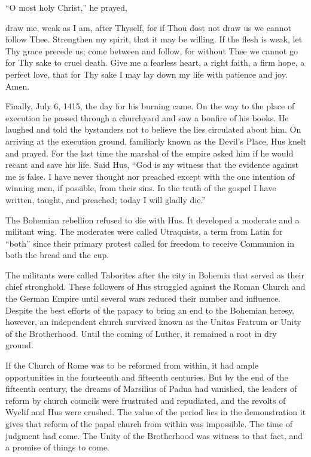 “O most holy Christ,” he prayed,

\begin{blockquote}
draw me, weak as I am, after Thyself, for if Thou dost not draw us we cannot follow Thee. Strengthen
my spirit, that it may be willing. If the flesh is weak, let Thy grace precede us; come between and
follow, for without Thee we cannot go for Thy sake to cruel death. Give me a fearless heart, a right
faith, a firm hope, a perfect love, that for Thy sake I may lay down my life with patience and joy.
Amen.
\end{blockquote}

Finally, July 6, 1415, the day for his burning came. On the way to the place of execution he passed
through a churchyard and saw a bonfire of his books. He laughed and told the bystanders not to
believe the lies circulated about him. On arriving at the execution ground, familiarly known as the
Devil’s Place, Hus knelt and prayed. For the last time the marshal of the empire asked him if he
would recant and save his life. Said Hus, “God is my witness that the evidence against me is false.
I have never thought nor preached except with the one intention of winning men, if possible, from
their sins. In the truth of the gospel I have written, taught, and preached; today I will gladly
die.”

The Bohemian rebellion refused to die with Hus. It developed a moderate and a militant wing. The
moderates were called Utraquists, a term from Latin for “both” since their primary protest called
for freedom to receive Communion in both the bread and the cup.

The militants were called Taborites after the city in Bohemia that served as their chief stronghold.
These followers of Hus struggled against the Roman Church and the German Empire until several wars
reduced their number and influence. Despite the best efforts of the papacy to bring an end to the
Bohemian heresy, however, an independent church survived known as the Unitas Fratrum or Unity of the
Brotherhood. Until the coming of Luther, it remained a root in dry ground.

If the Church of Rome was to be reformed from within, it had ample opportunities in the fourteenth
and fifteenth centuries. But by the end of the fifteenth century, the dreams of Marsilius of Padua
had vanished, the leaders of reform by church councils were frustrated and repudiated, and the
revolts of Wyclif and Hus were crushed. The value of the period lies in the demonstration it gives
that reform of the papal church from within was impossible. The time of judgment had come. The Unity
of the Brotherhood was witness to that fact, and a promise of things to come.

